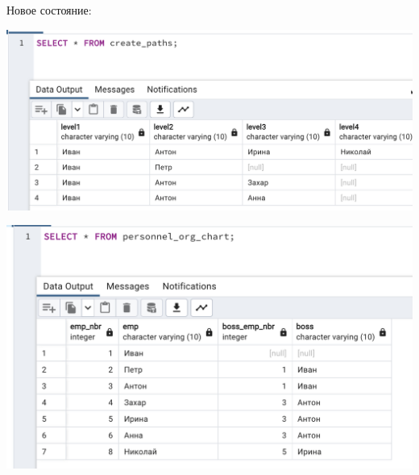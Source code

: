 \documentclass[a4paper,12pt]{article}
\begin{document}
Новое состояние:
\begin{flushleft}
\includegraphics[scale=0.5]{15_5.png}
\end{flushleft}
\begin{flushleft}
\includegraphics[scale=0.5]{15_6.png}
\end{flushleft}
\clearpage
\end{document}
